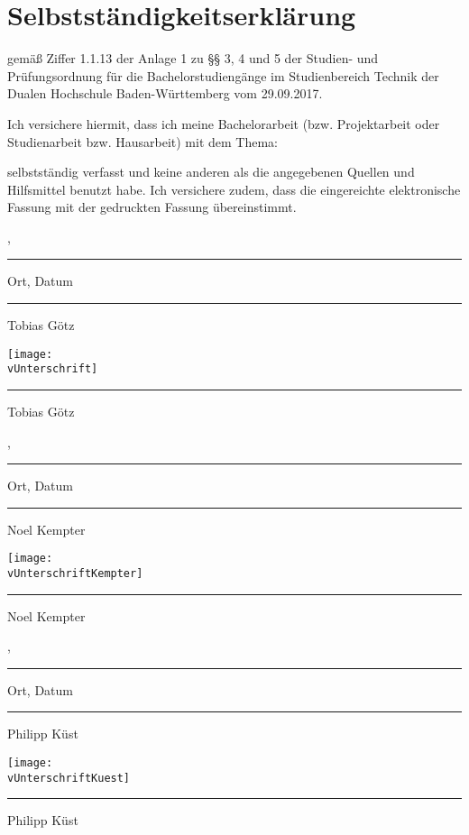 \thispagestyle{empty}
\section*{\Huge{Selbstständigkeitserklärung}}

gemäß Ziffer 1.1.13 der Anlage 1 zu §§ 3, 4 und 5  der Studien- und Prüfungsordnung für die Bachelorstudiengänge im Studienbereich Technik der Dualen Hochschule Baden-Würt­tem­berg vom 29.09.2017.

\noindent Ich versichere hiermit, dass ich meine Bachelorarbeit (bzw. Projektarbeit oder Studienarbeit bzw. Hausarbeit) mit dem Thema: 
\begin{center}
	\Large\textbf{\vTitel}
\end{center}
selbstständig verfasst und keine anderen als die angegebenen Quellen und Hilfsmittel benutzt habe. Ich versichere zudem, dass die eingereichte elektronische Fassung mit der gedruckten Fassung übereinstimmt.

\vfill
\leavevmode

\parbox{6cm}{\strut\centering \vBearbeitungsort, \vAbgabedatum\hrule\strut\centering\footnotesize Ort, Datum} 
\hfill
\ifx\vUnterschrift\empty
\parbox{6cm}{\strut\hspace{1pt} \vAbteilung \hrule\strut\centering\footnotesize Tobias Götz}
\else
\parbox{6cm}{\strut\hspace{1pt} \vAbteilung \parbox[b]{3cm}{\vspace{-10cm}\texttt{[image: \\vUnterschrift]}}\hrule\strut\centering\footnotesize Tobias Götz}
\fi
\vspace{1cm}

\parbox{6cm}{\strut\centering \vBearbeitungsort, \vAbgabedatum\hrule\strut\centering\footnotesize Ort, Datum}
\hfill
\ifx\vUnterschriftKempter\empty
\parbox{6cm}{\strut\hspace{1pt} \vAbteilung \hrule\strut\centering\footnotesize Noel Kempter}
\else
\parbox{6cm}{\strut\hspace{1pt} \vAbteilung \parbox[b]{3cm}{\vspace{-10cm}\texttt{[image: \\vUnterschriftKempter]}}\hrule\strut\centering\footnotesize Noel Kempter}
\fi
\vspace{1cm}

\parbox{6cm}{\strut\centering \vBearbeitungsort, \vAbgabedatum\hrule\strut\centering\footnotesize Ort, Datum}
\hfill
\ifx\vUnterschriftKuest\empty
\parbox{6cm}{\strut\hspace{1pt} \vAbteilung \hrule\strut\centering\footnotesize Philipp Küst}
\else
\parbox{6cm}{\strut\hspace{1pt} \vAbteilung \parbox[b]{3cm}{\vspace{-10cm}\texttt{[image: \\vUnterschriftKuest]}}\hrule\strut\centering\footnotesize Philipp Küst}
\fi
\vspace{1cm}

\newpage